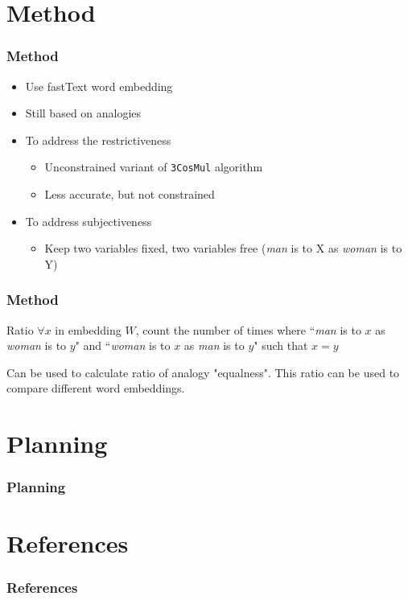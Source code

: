 \documentclass{beamer}
\begin{document}
\section{Method}
\begin{frame}
\frametitle{Method}
\begin{itemize}
    \item Use fastText word embedding
    \pause
    \item Still based on analogies
    \pause
    \item To address the restrictiveness
    \begin{itemize}
        \item Unconstrained variant of \texttt{3CosMul} algorithm 
        \item Less accurate, but not constrained
    \end{itemize}
    \pause
    \item To address subjectiveness
    \begin{itemize}
        \item Keep two variables fixed, two variables free
            \newline
        (\textit{man} is to X as \textit{woman} is to Y)
    \end{itemize}

\end{itemize}
\end{frame}

\begin{frame}
\frametitle{Method}
\begin{block}{Ratio}
$\forall x$ in embedding $W$, count the number of times where ``\textit{man} is to $x$ as \textit{woman} is to $y$" and ``\textit{woman} is to $x$ as \textit{man} is to $y$" such that $x=y$
\end{block}
Can be used to calculate ratio of analogy "equalness". This ratio can be used to
compare different word embeddings.

\end{frame}

\section{Planning}
\begin{frame}
\frametitle{Planning}
\end{frame}

\section{References}
\begin{frame}
\frametitle{References}
\printbibliography[heading=none]
\end{frame}
\end{document}
